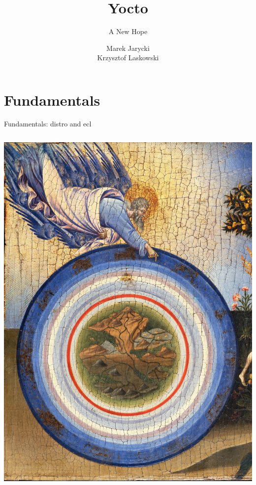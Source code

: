 \documentclass{beamer}
\title[Yocto: A New Hope]{Yocto}
\subtitle{A New Hope}
\author[M. Jarycki, K. Laskowski]{
    Marek Jarycki \\
    Krzysztof Laskowski
}
\begin{document}
\begin{frame}
    \titlepage
\end{frame}

\section{Fundamentals}

\begin{frame}{Fundamentals: distro and ecl}
    \begin{columns}
            \centering
            \includegraphics[width=\linewidth,trim={0 1cm 0 2cm},clip]{img/Giovanni_di_Paolo_-_Creation.jpg}
            \centering

\end{columns}
\end{frame}
\end{document}
